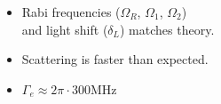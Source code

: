 \documentclass{beamer}
\begin{document}
\begin{frame}{}
  \begin{columns}
    \column{6cm}
    \begin{itemize}
    \item<+-> Rabi frequencies ($\Omega_R$, $\Omega_1$, $\Omega_2$)\\
      and light shift ($\delta_L$) matches theory.
    \item<+-> Scattering is faster than expected.
    \item<+-> $\Gamma_e\approx2\pi\cdot300\mathrm{MHz}$
    \end{itemize}
    \column{6cm}
    \begin{center}
    \end{center}
  \end{columns}
\end{frame}




\end{document}
